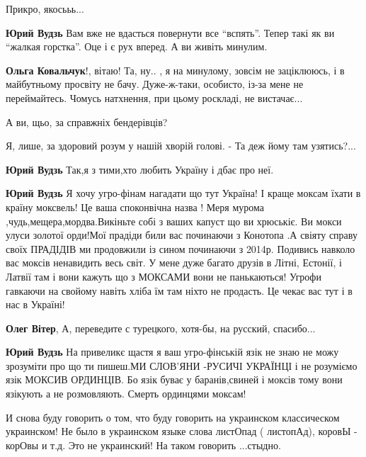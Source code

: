 \begin{itemize}
{\begin{itemize}
Прикро, якосььь...

\textbf{Юрий Вудзь} Вам вже не вдасться повернути все \enquote{вспять}. Тепер
такі як ви \enquote{жалкая горстка}. Оце і є рух вперед. А ви живіть минулим.


\textbf{Ольга Ковальчук}!, вітаю!  Та, ну.. , я на минулому, зовсім не заціклююсь, і в
майбутньому просвіту не бачу. Дуже-ж-таки, особисто, із-за мене не
переймайтесь.  Чомусь натхнення, при цьому роскладі, не вистачає...

А ви, щьо, за справжніх бендерівців?

Я, лише, за здоровий розум у нашій хворій голові.
- Та деж йому там узятись?...

\textbf{Юрий Вудзь} Так,я з тими,хто любить Україну і дбає про неї.

\textbf{Юрий Вудзь} Я хочу угро-фінам нагадати що тут Україна! І краще моксам
їхати в країну моксвель! Це ваша споконвічна назва ! Меря мурома
,чудь,мещера,мордва.Викіньте собі з ваших капуст що ви хрюськіє. Ви мокси улуси
золотої орди!Мої прадіди били вас починаючи з Конотопа .А свіяту справу своїх
ПРАДІДІВ ми продовжили із сином починаючи з 2014р. Подивись навколо вас моксів
ненавидить весь світ. У мене дуже багато друзів в Літні, Естонії, і Латвії там
і вони кажуть що з МОКСАМИ вони не панькаються! Угрофи гавкаючи на свойому
навіть хліба їм там ніхто не продасть. Це чекає вас тут і в нас в Україні!

\textbf{Олег Вітер},
А, переведите с турецкого, хотя-бы, на русский, спасибо...

\textbf{Юрий Вудзь} На привеликє щастя я ваш угро-фінській язік не знаю не можу
зрозуміти про що ти пишеш.МИ СЛОВ'ЯНИ -РУСИЧІ УКРАЇНЦІ і не розуміємо язік
МОКСИВ ОРДИНЦІВ. Бо язік буває у баранів,свиней і моксів тому вони язікують а
не розмовляють. Смерть ординцями моксам!
\end{itemize}


И снова буду говорить о том, что буду говорить на украинском классическом
украинском! Не было в украинском языке слова листОпад ( листопАд), коровЫ -
корОвы и т.д. Это не украинский! На таком говорить ...стыдно.

\begin{itemize}


\end{itemize}}
\end{itemize}
